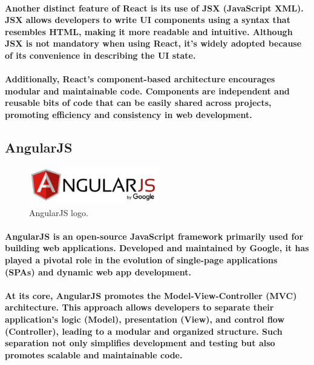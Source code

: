 \documentclass[12pt,a4paper]{article}
\begin{document}
    \paragraph{Another distinct feature of React is its use of JSX (JavaScript XML). JSX allows developers to write UI components using a syntax that resembles HTML, making it more readable and intuitive. Although JSX is not mandatory when using React, it’s widely adopted because of its convenience in describing the UI state.}
    
    \paragraph{Additionally, React’s component-based architecture encourages modular and maintainable code. Components are independent and reusable bits of code that can be easily shared across projects, promoting efficiency and consistency in web development.}

    \subsection{AngularJS}

    \begin{figure}[h!]
      \centering
      \includegraphics[width=0.5\textwidth]{angular.png}
      \caption{AngularJS logo.}
    \end{figure}
    
    \paragraph{AngularJS is an open-source JavaScript framework primarily used for building web applications. Developed and maintained by Google, it has played a pivotal role in the evolution of single-page applications (SPAs) and dynamic web app development.}
    
    \paragraph{At its core, AngularJS promotes the Model-View-Controller (MVC) architecture. This approach allows developers to separate their application’s logic (Model), presentation (View), and control flow (Controller), leading to a modular and organized structure. Such separation not only simplifies development and testing but also promotes scalable and maintainable code.}
    
\end{document}
